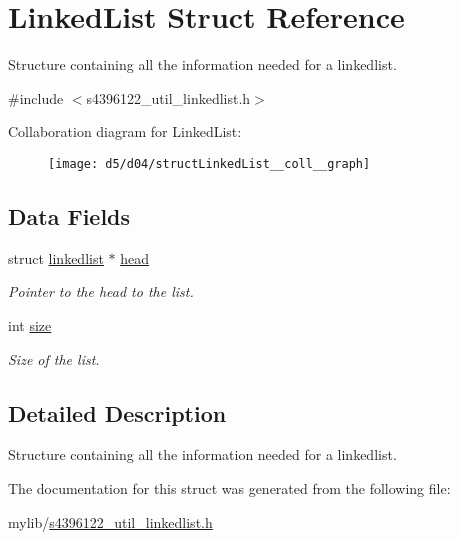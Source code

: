 \hypertarget{structLinkedList}{}\section{Linked\+List Struct Reference}
\label{structLinkedList}


Structure containing all the information needed for a linkedlist.  




{\ttfamily \#include $<$s4396122\+\_\+util\+\_\+linkedlist.\+h$>$}



Collaboration diagram for Linked\+List\+:\nopagebreak
\begin{figure}[H]
\begin{center}
\leavevmode
\texttt{[image: d5/d04/structLinkedList\_\_coll\_\_graph]}
\end{center}
\end{figure}
\subsection*{Data Fields}
\begin{DoxyCompactItemize}
\item 
struct \hyperlink{structlinkedlist}{linkedlist} $\ast$ \hyperlink{structLinkedList_ad0529bfec20bc43e95bb68a8bb8bf1a1}{head}\hypertarget{structLinkedList_ad0529bfec20bc43e95bb68a8bb8bf1a1}{}\label{structLinkedList_ad0529bfec20bc43e95bb68a8bb8bf1a1}

\begin{DoxyCompactList}\small\item\em Pointer to the head to the list. \end{DoxyCompactList}\item 
int \hyperlink{structLinkedList_ad84541a559b15c98b3171c5d24ad90ef}{size}\hypertarget{structLinkedList_ad84541a559b15c98b3171c5d24ad90ef}{}\label{structLinkedList_ad84541a559b15c98b3171c5d24ad90ef}

\begin{DoxyCompactList}\small\item\em Size of the list. \end{DoxyCompactList}\end{DoxyCompactItemize}


\subsection{Detailed Description}
Structure containing all the information needed for a linkedlist. 

The documentation for this struct was generated from the following file\+:\begin{DoxyCompactItemize}
\item 
mylib/\hyperlink{s4396122__util__linkedlist_8h}{s4396122\+\_\+util\+\_\+linkedlist.\+h}\end{DoxyCompactItemize}
